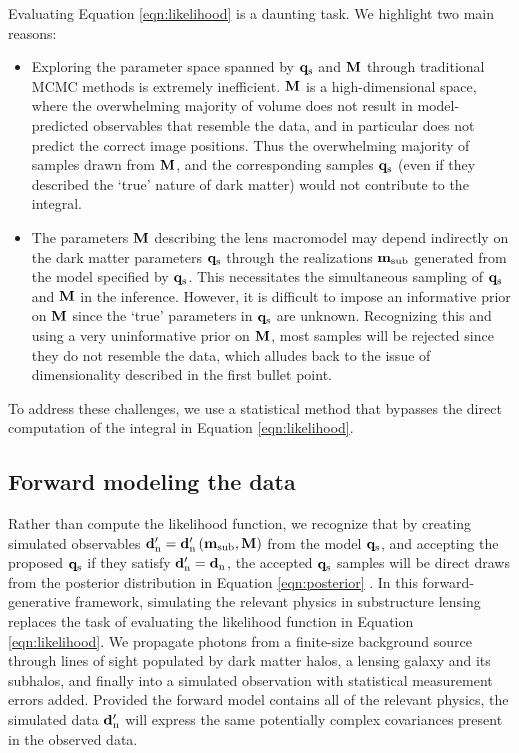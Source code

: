 Evaluating Equation \ref{eqn:likelihood} is a daunting task. We highlight two main reasons: 
\begin{itemize}
	\item Exploring the parameter space spanned by ${\bf{q}_{\rm{s}}}$ and ${\bf{M}}$ through traditional MCMC methods is extremely inefficient. ${}{\bf{M}}$ is a high-dimensional space, where the overwhelming majority of volume does not result in model-predicted observables that resemble the data, and in particular does not predict the correct image positions. Thus the overwhelming majority of samples drawn from ${}{\bf{M}}$, and the corresponding samples ${\bf{q}_{\rm{s}}}$ (even if they described the `true' nature of dark matter) would not contribute to the integral.
	\item The parameters ${}{\bf{M}}$ describing the lens macromodel may depend indirectly on the dark matter parameters ${\bf{q}_{\rm{s}}}$ through the realizations ${\bf{m}_{\rm{sub}}}$ generated from the model specified by ${\bf{q}_{\rm{s}}}$. This necessitates the simultaneous sampling of ${\bf{q}_{\rm{s}}}$ and ${\bf{M}}$ in the inference. However, it is difficult to impose an informative prior on ${}{\bf{M}}$ since the `true' parameters in ${\bf{q}_{\rm{s}}}$ are unknown. Recognizing this and using a very uninformative prior on ${}{\bf{M}}$, most samples will be rejected since they do not resemble the data, which alludes back to the issue of dimensionality described in the first bullet point. 
\end{itemize} 
To address these challenges, we use a statistical method that bypasses the direct computation of the integral in Equation \ref{eqn:likelihood}. 

\subsection{Forward modeling the data}
Rather than compute the likelihood function, we recognize that by creating simulated observables ${\bf{d}_{\rm{n}}^{\prime}} = {\bf{d}_{\rm{n}}^{\prime}} \left({\bf{m}_{\rm{sub}}}, {}{\bf{M}} \right)$ from the model ${\bf{q}_{\rm{s}}}$, and accepting the proposed ${\bf{q}_{\rm{s}}}$ if they satisfy ${\bf{d}_{\rm{n}}^{\prime}} = {\bf{d}_{\rm{n}}}$, the accepted ${\bf{q}_{\rm{s}}}$ samples will be direct draws from the posterior distribution in Equation \ref{eqn:posterior} \citep{Rubin1984}. In this forward-generative framework, simulating the relevant physics in substructure lensing replaces the task of evaluating the likelihood function in Equation \ref{eqn:likelihood}. We propagate photons from a finite-size background source through lines of sight populated by dark matter halos, a lensing galaxy and its subhalos, and finally into a simulated observation with statistical measurement errors added. Provided the forward model contains all of the relevant physics, the simulated data ${\bf{d}_{\rm{n}}^{\prime}}$ will express the same potentially complex covariances present in the observed data.

